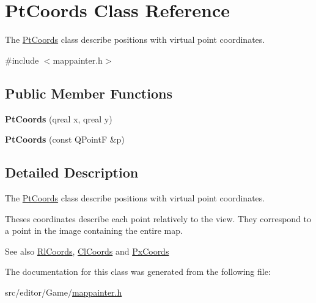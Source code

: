 \hypertarget{class_pt_coords}{\section{\-Pt\-Coords \-Class \-Reference}
\label{class_pt_coords}
}


\-The \hyperlink{class_pt_coords}{\-Pt\-Coords} class describe positions with virtual point coordinates.  




{\ttfamily \#include $<$mappainter.\-h$>$}

\subsection*{\-Public \-Member \-Functions}
\begin{DoxyCompactItemize}
\item 
\hypertarget{class_pt_coords_ad384f0c2b1e4ac127cfd2aa789810536}{{\bfseries \-Pt\-Coords} (qreal x, qreal y)}\label{class_pt_coords_ad384f0c2b1e4ac127cfd2aa789810536}

\item 
\hypertarget{class_pt_coords_a8e30f67406d22baf10a4556435562248}{{\bfseries \-Pt\-Coords} (const \-Q\-Point\-F \&p)}\label{class_pt_coords_a8e30f67406d22baf10a4556435562248}

\end{DoxyCompactItemize}


\subsection{\-Detailed \-Description}
\-The \hyperlink{class_pt_coords}{\-Pt\-Coords} class describe positions with virtual point coordinates. 

\-Theses coordinates describe each point relatively to the view. \-They correspond to a point in the image containing the entire map.

\-See also \hyperlink{class_rl_coords}{\-Rl\-Coords}, \hyperlink{class_cl_coords}{\-Cl\-Coords} and \hyperlink{class_px_coords}{\-Px\-Coords} 

\-The documentation for this class was generated from the following file\-:\begin{DoxyCompactItemize}
\item 
src/editor/\-Game/\hyperlink{mappainter_8h}{mappainter.\-h}\end{DoxyCompactItemize}
